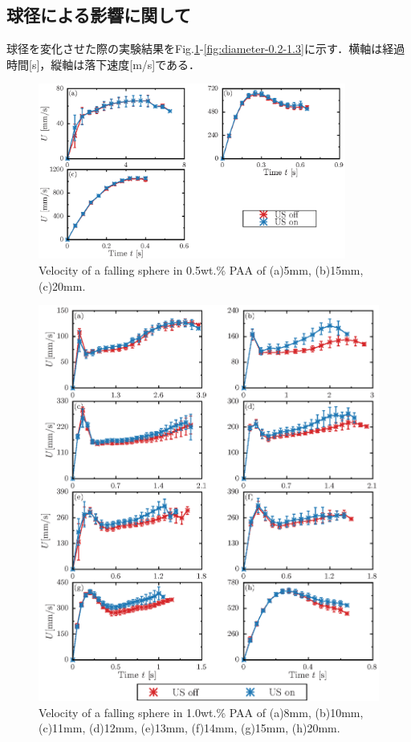 \subsection{球径による影響に関して}

球径を変化させた際の実験結果をFig.\ref{fig:diameter-0.5}-\ref{fig:diameter-0.2-1.3}に示す．横軸は経過時間[s]，縦軸は落下速度[m/s]である．

\begin{figure}[H]
    \centering
    \includegraphics[width=0.9\textwidth]{X-Appendix/diameter-0.5/diameter.eps}
    \caption{Velocity of a falling sphere in 0.5wt.\% PAA of (a)5mm, (b)15mm, (c)20mm.}
    \label{fig:diameter-0.5}
\end{figure}

\begin{figure}[H]
    \centering
    \includegraphics[width=1\textwidth]{X-Appendix/diameter/diameter.eps}
    \caption{Velocity of a falling sphere in 1.0wt.\% PAA of (a)8mm, (b)10mm, (c)11mm, (d)12mm, (e)13mm, (f)14mm, (g)15mm, (h)20mm.}
    \label{fig:diameter}
\end{figure}

